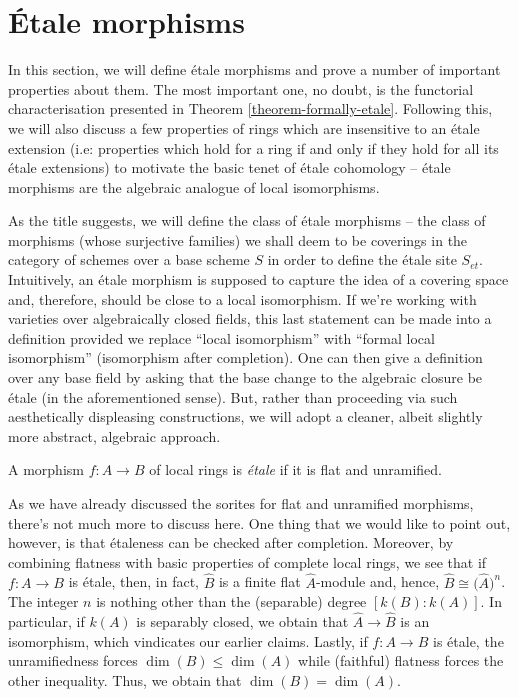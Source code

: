 \section{\'Etale morphisms}
\label{section-etale-moprhisms}

\noindent
In this section, we will define \'etale morphisms and prove a number of
important properties about them. The most important one, no doubt, is the
functorial characterisation presented in Theorem \ref{theorem-formally-etale}.
Following this, we will also discuss a few properties of rings which are
insensitive to an \'etale extension (i.e: properties which hold for a ring
if and only if they hold for all its \'etale extensions) to motivate the basic
tenet of \'etale cohomology -- \'etale morphisms are the algebraic analogue of
local isomorphisms.

\medskip\noindent
As the title suggests, we will define the class of \'etale morphisms -- the
class of morphisms (whose surjective families) we shall deem to be coverings
in the category of schemes over a base scheme $S$ in order to define the
\'etale site $S_{et}$. Intuitively, an \'etale morphism is supposed to
capture the idea of a covering space and, therefore, should be close to a
local isomorphism. If we're working with varieties over algebraically closed
fields, this last statement can be made into a definition provided we replace
``local isomorphism'' with ``formal local isomorphism'' (isomorphism after
completion). One can then give a definition over any base field by asking
that the base change to the algebraic closure be \'etale (in the
aforementioned sense). But, rather than proceeding via such aesthetically
displeasing constructions, we will adopt a cleaner, albeit slightly more
abstract, algebraic approach.

\begin{definition}
\label{definition-etale-ring}
A morphism $f : A \to B$ of local rings is
{\it \'etale} if it is flat and unramified.
\end{definition}

\noindent
As we have already discussed the sorites for flat and unramified morphisms,
there's not much more to discuss here. One thing that we would like to point
out, however, is that \'etaleness can be checked after completion. Moreover,
by combining flatness with basic properties of complete local rings, we see
that if $f : A \to B$ is \'etale, then, in fact, $\widehat{B}$ is a finite flat
$\widehat{A}$-module and, hence, $\widehat{B} \cong \big(\widehat{A}\big)^n$.
The integer $n$ is nothing other than the (separable) degree $[k(B) : k(A)]$.
In particular, if $k(A)$ is separably closed, we obtain that
$\widehat{A} \to \widehat{B}$ is an isomorphism, which vindicates our earlier
claims. Lastly, if $f : A \to B$ is \'etale, the unramifiedness forces
$\dim(B) \leq  \dim(A)$ while (faithful) flatness forces the other
inequality. Thus, we obtain that $\dim(B) = \dim(A)$.

